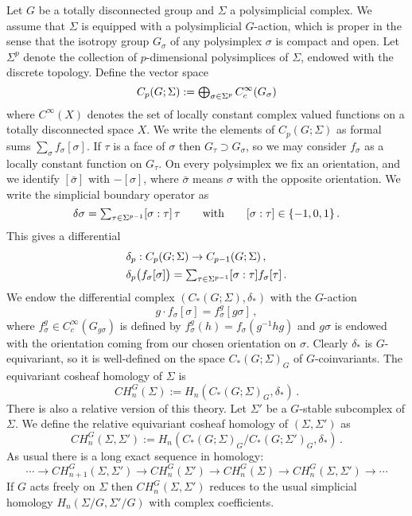 Let $G$ be a totally disconnected group and $\Sigma$ a polysimplicial
complex. We assume that $\Sigma$ is equipped with a polysimplicial $G$-action,
which is proper in the sense that the isotropy group $G_\sigma$ of any 
polysimplex $\sigma$ is compact and open. Let $\Sigma^p$ denote the collection 
of $p$-dimensional polysimplices of $\Sigma$, endowed with the discrete topology. 
Define the vector space 
\[
C_p (G ; \Sigma ) := {\textstyle \bigoplus_{\sigma \in \Sigma^p} } \, C_c^\infty (G_\sigma )
\]
where $C^\infty (X)$ denotes the set of locally constant complex valued functions
on a totally disconnected space $X$. We write the elements of $C_p (G;\Sigma )$
as formal sums $\sum_\sigma f_\sigma [\sigma ]$. If $\tau$ is a face of $\sigma$
then $G_\tau \supset G_\sigma$, so we may consider $f_\sigma$ as a locally constant
function on $G_\tau$. On every polysimplex we fix an orientation, and we identify
$[\bar \sigma]$ with $-[\sigma]$, where $\bar \sigma$ means $\sigma$ with the
opposite orientation. We write the simplicial boundary operator as
\[
\delta \sigma = {\textstyle \sum_{\tau \in \Sigma^{p-1}} } [\sigma : \tau] \, \tau \qquad 
\text{with} \qquad [\sigma : \tau ] \in \{ -1,0,1 \} \,.
\]
This gives a differential
\begin{align*}
& \delta_p : C_p (G ; \Sigma) \to C_{p-1} (G;\Sigma ) \,, \\
& \delta_p \big( f_\sigma [\sigma] \big) = {\textstyle \sum_{\tau \in \Sigma^{p-1}} }
[\sigma : \tau] f_\sigma [\tau] \,.
\end{align*}
We endow the differential complex $( C_* (G;\Sigma ) ,\delta_* )$ with
the $G$-action 
\[
g \cdot f_\sigma [\sigma ] = f_\sigma^g [g \sigma] \,,
\]
where $f_\sigma^g \in C_c^\infty (G_{g \sigma})$ is defined by
$f_\sigma^g (h) = f_\sigma (g^{-1} h g)$ and $g \sigma$ is endowed with the
orientation coming from our chosen orientation on $\sigma$. Clearly $\delta_*$ is 
$G$-equivariant, so it is well-defined on the space $C_* (G;\Sigma )_G$ of 
$G$-coinvariants. The equivariant cosheaf homology of $\Sigma$ is 
\begin{equation}
CH_n^G (\Sigma ) := H_n ( C_* (G;\Sigma )_G ,\delta_* ) \,.
\end{equation}
There is also a relative version of this theory. Let $\Sigma'$ be a $G$-stable
subcomplex of $\Sigma$. We define the relative equivariant cosheaf homology of
$(\Sigma ,\Sigma')$ as
\begin{equation}
CH_n^G (\Sigma ,\Sigma' ) := 
H_n ( C_* (G;\Sigma )_G / C_* (G;\Sigma')_G ,\delta_* ) \,.
\end{equation}
As usual there is a long exact sequence in homology:
\begin{equation}\label{eq:3.22}
\cdots \to CH_{n+1}^G (\Sigma ,\Sigma') \to CH_n^G (\Sigma' ) 
\to CH^G_n (\Sigma ) \to CH_n^G (\Sigma ,\Sigma') \to \cdots
\end{equation}
If $G$ acts freely on $\Sigma$ then $CH^G_n (\Sigma ,\Sigma')$ reduces
to the usual simplicial homology $H_n (\Sigma /G ,\Sigma' /G) $
with complex coefficients.

